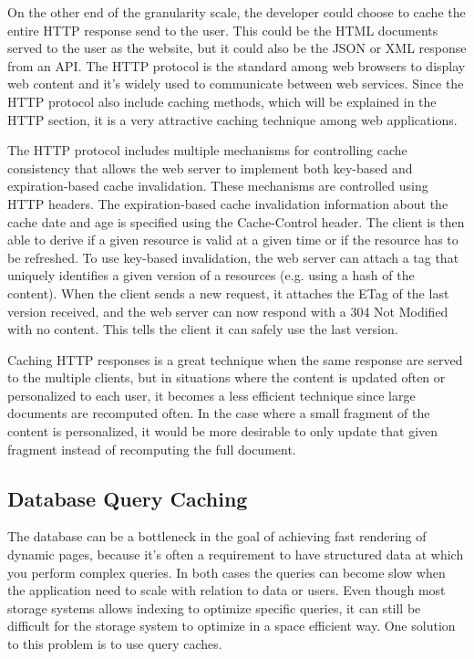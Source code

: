 On the other end of the granularity scale, the developer could choose to cache the entire HTTP response send to the user. This could be the HTML documents served to the user as the website, but it could also be the JSON or XML response from an API. The HTTP protocol is the standard among web browsers to display web content and it’s widely used to communicate between web services. Since the HTTP protocol also include caching methods, which will be explained in the HTTP section, it is a very attractive caching technique among web applications.

The HTTP protocol includes multiple mechanisms for controlling cache consistency that allows the web server to implement both key-based and expiration-based cache invalidation. These mechanisms are controlled using HTTP headers. The expiration-based cache invalidation information about the cache date and age is specified using the Cache-Control header. The client is then able to derive if a given resource is valid at a given time or if the resource has to be refreshed. To use key-based invalidation, the web server can attach a tag that uniquely identifies a given version of a resources (e.g. using a hash of the content). When the client sends a new request, it attaches the ETag of the last version received, and the web server can now respond with a 304 Not Modified with no content. This tells the client it can safely use the last version.

Caching HTTP responses is a great technique when the same response are served to the multiple clients, but in situations where the content is updated often or personalized to each user, it becomes a less efficient technique since large documents are recomputed often. In the case where a small fragment of the content is personalized, it would be more desirable to only update that given fragment instead of recomputing the full document.


\subsection{Database Query Caching}

The database can be a bottleneck in the goal of achieving fast rendering of dynamic pages, because it’s often a requirement to have structured data at which you perform complex queries. In both cases the queries can become slow when the application need to scale with relation to data or users. Even though most storage systems allows indexing to optimize specific queries, it can still be difficult for the storage system to optimize in a space efficient way. One solution to this problem is to use query caches.

